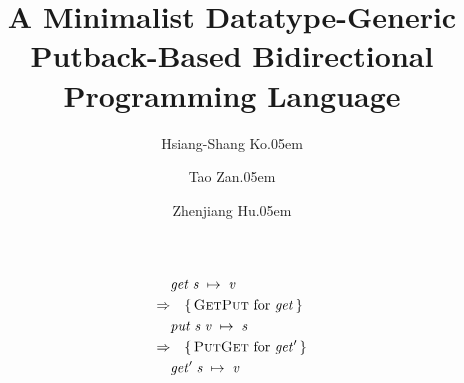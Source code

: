 \documentclass{llncs}
\newcommand{\identifier}[1]{\mathit{#1}}
\newcommand{\reason}[1]{\quad\{\,\text{#1}\,\}}
\newcommand{\PutGet}{\textsc{PutGet}}
\newcommand{\GetPut}{\textsc{GetPut}}
\begin{document}
\title{A Minimalist Datatype-Generic Putback-Based Bidirectional Programming Language}
\author{Hsiang-Shang Ko\kern.05em \and Tao Zan\kern.05em \and Zhenjiang Hu\kern.05em}
\maketitle

\cite{Foster-lenses}

\begin{align*}
           & \ensuremath{\identifier{get}\;\identifier{s}\;\mathrel{\mapsto}\;\identifier{v}} \\
\Rightarrow& \reason{\GetPut\ for \ensuremath{\identifier{get}}} \\
           & \ensuremath{\identifier{put}\;\identifier{s}\;\identifier{v}\;\mathrel{\mapsto}\;\identifier{s}} \\
\Rightarrow& \reason{\PutGet\ for \ensuremath{\identifier{get'}}} \\
           & \ensuremath{\identifier{get'}\;\identifier{s}\;\mathrel{\mapsto}\;\identifier{v}}
\end{align*}



\end{document}
